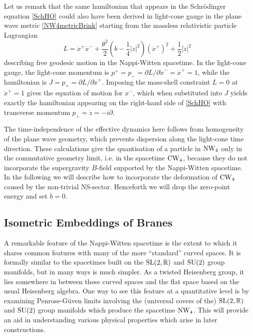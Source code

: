 Let us remark that the same hamiltonian that appears in the Schr\"odinger
equation \eqref{SchHO} could also have been derived in light-cone gauge in the
plane wave metric \eqref{NW4metricBrink} starting from the massless relativistic
particle Lagrangian
\begin{equation}
  \label{masslessLag}
  L=\dot x^+ \dot x^-+\frac{\theta^2}2  \left(b-\frac14  
    |z|^2\right) \left(\dot x^+\right)^2+\frac12  \left|\dot z\right|^2
\end{equation}
describing free geodesic motion in the Nappi-Witten spacetime. In the light-cone
gauge, the light-cone momentum is $p^+=p_-=\partial L/\partial\dot x^-=\dot
x^+=1$, while the hamiltonian is $J=p_+=\partial L/\partial\dot x^+$. Imposing
the mass-shell constraint $L=0$ at $\dot x^+=1$ gives the equation of motion for
$x^-$, which when substituted into $J$ yields exactly the hamiltonian appearing
on the right-hand side of \eqref{SchHO} with transverse momentum $p^{
}_\perp=\dot z=- i \partial$.

The time-independence of the effective dynamics here follows from homogeneity of
the plane wave geometry, which prevents dispersion along the light-cone time
direction. These calculations give the quantisation of a particle in $\operatorname{NW}_4$
only in the commutative geometry limit, i.e. in the spacetime $\operatorname{CW}_4$, because
they do not incorporate the supergravity $B$-field supported by the Nappi-Witten
spacetime. In the following we will describe how to incorporate the deformation
of $\operatorname{CW}_4$ caused by the non-trivial NS-sector. Henceforth we will drop the
zero-point energy and set $b=0$.

\subsection{Isometric Embeddings of Branes}
\label{IsomEmb}
A remarkable feature of the Nappi-Witten spacetime is the extent to which it
shares common features with many of the more ``standard'' curved spaces. It is
formally similar to the spacetimes built on the ${\rm SL}(2,{\mathbb R})$ and ${\rm
  SU}(2)$ group manifolds, but in many ways is much simpler. As a twisted
Heisenberg group, it lies somewhere in between these curved spaces and the flat
space based on the usual Heisenberg algebra. One way to see this feature at a
quantitative level is by examining Penrose-G\"uven limits involving the
(universal covers of the) ${\rm SL}(2,{\mathbb R})$ and ${\rm SU}(2)$ group manifolds
which produce the spacetime $\operatorname{NW}_4$. This will provide an aid in understanding
various physical properties which arise in later constructions.


